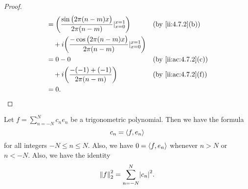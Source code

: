 \begin{proof}
\begin{align*}
     & = \bigg(\dfrac{\sin\big(2 \pi (n - m) x\big)}{2 \pi (n - m)}|_{x = 0}^{x = 1}\bigg)          &  & \by{ii:4.7.2}[b]    \\
     & \quad + i \bigg(\dfrac{-\cos\big(2 \pi (n - m) x\big)}{2 \pi (n - m)}|_{x = 0}^{x = 1}\bigg)                          \\
     & = 0 - 0                                                                                      &  & \by{ii:ac:4.7.2}[c] \\
     & \quad + i \bigg(\dfrac{- (-1) + (-1)}{2 \pi (n - m)}\bigg)                                   &  & \by{ii:ac:4.7.2}[f] \\
     & = 0.
  \end{align*}
\end{proof}

\begin{cor}\label{ii:5.3.6}
  Let \(f = \sum_{n = -N}^N c_n e_n\) be a trigonometric polynomial.
  Then we have the formula
  \[
    c_n = \inner*{f, e_n}
  \]
  for all integers \(-N \leq n \leq N\).
  Also, we have \(0 = \inner*{f, e_n}\) whenever \(n > N\) or \(n < -N\).
  Also, we have the identity
  \[
    \norm*{f}_2^2 = \sum_{n = -N}^N \abs{c_n}^2.
  \]
\end{cor}

